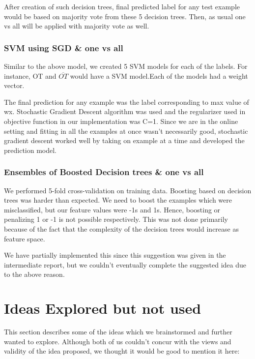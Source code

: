 \documentclass[letterpaper,twocolumn,11pt]{article}
\begin{document}
After creation of such decision trees, final predicted label for any test example would be based on majority vote from these 5 decision trees. Then, as usual one vs all will be applied with majority vote as well.

\subsubsection{SVM using SGD \& one vs all}
Similar to the above model, we created 5 SVM models for each of the labels. For instance, OT and $\overline{OT}$ would have a SVM model.Each of the models had a weight vector.

The final prediction for any example was the label corresponding to max value of wx. Stochastic Gradient Descent algorithm was used and the regularizer used in objective function in our implementation was C=1. Since we are in the online setting and fitting in all the examples at once wasn't necessarily good, stochastic gradient descent worked well by taking on example at a time and developed the prediction model.

\subsubsection{Ensembles of Boosted Decision trees \& one vs all}
We performed 5-fold cross-validation on training data. Boosting based on decision trees was harder than expected. We need to boost the examples which were misclassified, but our feature values were -1s and 1s. Hence, boosting or penalizing 1 or -1 is not possible respectively. This was not done primarily because of the fact that the complexity of the decision trees would increase as feature space.

We have partially implemented this since this suggestion was given in the intermediate report, but we couldn't eventually complete the suggested idea due to the above reason. 

\section{Ideas Explored but not used}
This section describes some of the ideas which we brainstormed and further wanted to explore. Although both of us couldn't concur with the views and validity of the idea proposed, we thought it would be good to mention it here:
\end{document}
